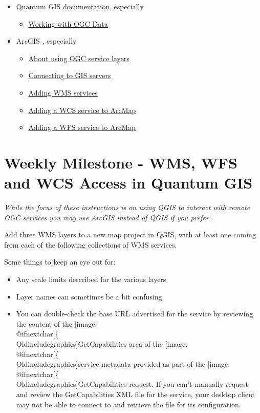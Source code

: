 \documentclass[]{book}
\makeatletter
\providecommand{\tightlist}{%
  \setlength{\itemsep}{0pt}\setlength{\parskip}{0pt}}
\def\ScaleIfNeeded{%
  \ifdim\Gin@nat@width>.5\linewidth
    .5\linewidth
  \else
    \Gin@nat@width
  \fi
}
\let\Oldincludegraphics\texttt{[image: \%
 \\catcode`\\@=11\\relax\%
 \%\\gdef\\includegraphics\{\\@ifnextchar[\{\\Oldincludegraphics]}{\Oldincludegraphics[width=\ScaleIfNeeded]}}%
\gdef\texttt{[image: \\@ifnextchar[\{\\Oldincludegraphics]}{\Oldincludegraphics[max size={.75\textwidth}{.75\textheight}]}}%
\makeatother
\begin{document}
\begin{itemize}
\tightlist
\item
  Quantum GIS
  \href{http://docs.qgis.org/2.8/en/docs/user_manual/}{documentation},
  especially

  \begin{itemize}
  \tightlist
  \item
    \href{http://docs.qgis.org/2.8/en/docs/user_manual/working_with_ogc/index.html}{Working
    with OGC Data}
  \end{itemize}
\item
  ArcGIS \href{}{}, especially

  \begin{itemize}
  \tightlist
  \item
    \href{http://desktop.arcgis.com/en/arcmap/10.3/map/web-maps-and-services/about-using-ogc-service-layers.htm}{About
    using OGC service layers}
  \item
    \href{http://desktop.arcgis.com/en/arcmap/10.3/manage-data/using-arccatalog/connecting-to-gis-servers.htm}{Connecting
    to GIS servers}
  \item
    \href{http://desktop.arcgis.com/en/arcmap/10.3/map/web-maps-and-services/adding-wms-services.htm}{Adding
    WMS services}
  \item
    \href{http://desktop.arcgis.com/en/arcmap/10.3/map/web-maps-and-services/adding-a-wcs-service-to-arcmap.htm}{Adding
    a WCS service to ArcMap}
  \item
    \href{http://desktop.arcgis.com/en/arcmap/10.3/map/web-maps-and-services/adding-a-wfs-service-to-arcmap.htm}{Adding
    a WFS service to ArcMap}
  \end{itemize}
\end{itemize}

\section{Weekly Milestone - WMS, WFS and WCS Access in Quantum
GIS}\label{week12-milestone}

\emph{While the focus of these instructions is on using QGIS to interact
with remote OGC services you may use ArcGIS instead of QGIS if you
prefer.}

Add three WMS layers to a new map project in QGIS, with at least one
coming from each of the following collections of WMS services.

Some things to keep an eye out for:

\begin{itemize}
\tightlist
\item
  Any scale limits described for the various layers
\item
  Layer names can sometimes be a bit confusing
\item
  You can double-check the base URL advertised for the service by
  reviewing the content of the \texttt{GetCapabilities} area of the
  \texttt{service} metadata provided as part of the
  \texttt{GetCapabilities} request. If you can't manually request and
  review the GetCapabilities XML file for the service, your desktop
  client may not be able to connect to and retrieve the file for its
  configuration.
\end{itemize}
\end{document}
